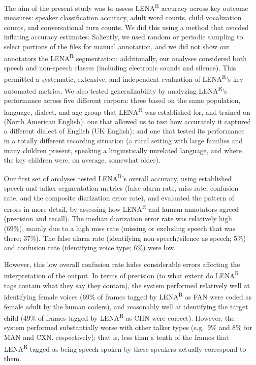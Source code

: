 \documentclass[english,table,man,floatsintext]{apa6}
\begin{document}
The aim of the present study was to assess LENA\textsuperscript{R} accuracy across key outcome measures: speaker classification accuracy, adult word counts, child vocalization counts, and conversational turn counts. We did this using a method that avoided inflating accuracy estimates: Saliently, we used random or periodic sampling to select portions of the files for manual annotation, and we did not show our annotators the LENA\textsuperscript{R} segmentation; additionally, our analyses considered both speech and non-speech classes (including electronic sounds and silence). This permitted a systematic, extensive, and independent evaluation of LENA\textsuperscript{R}'s key automated metrics. We also tested generalizability by analyzing LENA\textsuperscript{R}'s performance across five different corpora: three based on the same population, language, dialect, and age group that LENA\textsuperscript{R} was established for, and trained on (North American English); one that allowed us to test how accurately it captured a different dialect of English (UK English); and one that tested its performance in a totally different recording situation (a rural setting with large families and many children present, speaking a linguistically unrelated language, and where the key children were, on average, somewhat older).

Our first set of analyses tested LENA\textsuperscript{R}'s overall accuracy, using established speech and talker segmentation metrics (false alarm rate, miss rate, confusion rate, and the composite diarization error rate), and evaluated the pattern of errors in more detail, by assessing how LENA\textsuperscript{R} and human annotators agreed (precision and recall). The median diarization error rate was relatively high (69\%), mainly due to a high miss rate (missing or excluding speech that was there; 37\%). The false alarm rate (identifying non-speech/silence as speech; 5\%) and confusion rate (identifying voice type; 6\%) were low.

However, this low overall confusion rate hides considerable errors affecting the interpretation of the output. In terms of precision (to what extent do LENA\textsuperscript{R} tags contain what they say they contain), the system performed relatively well at identifying female voices (69\% of frames tagged by LENA\textsuperscript{R} as FAN were coded as female adult by the human coders), and reasonably well at identifying the target child (49\% of frames tagged by LENA\textsuperscript{R} as CHN were correct). However, the system performed substantially worse with other talker types (e.g.~9\% and 8\% for MAN and CXN, respectively); that is, less than a tenth of the frames that LENA\textsuperscript{R} tagged as being speech spoken by these speakers actually correspond to them.
\end{document}
